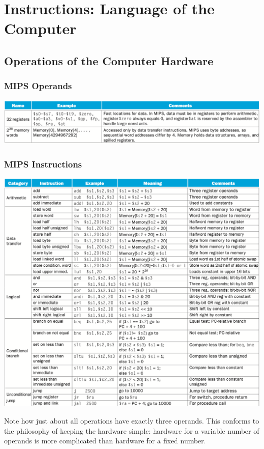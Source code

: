 \documentclass[10pt]{article}
\begin{document}
\section{Instructions: Language of the Computer}
\addtocounter{subsection}{1}
\subsection{Operations of the Computer Hardware}\label{subsec:}
\subsubsection{MIPS Operands}
\begin{center}
\includegraphics[width=\linewidth]{6.png}
\end{center}
\subsubsection{MIPS Instructions}
\begin{center}
\includegraphics[width=\linewidth]{7.png}
\end{center}
Note how just about all operations have exactly three operands.  This conforms to the philosophy of keeping the hardware simple: hardware for a variable number of operands is more complicated than hardware for a fixed number.
\end{document}
